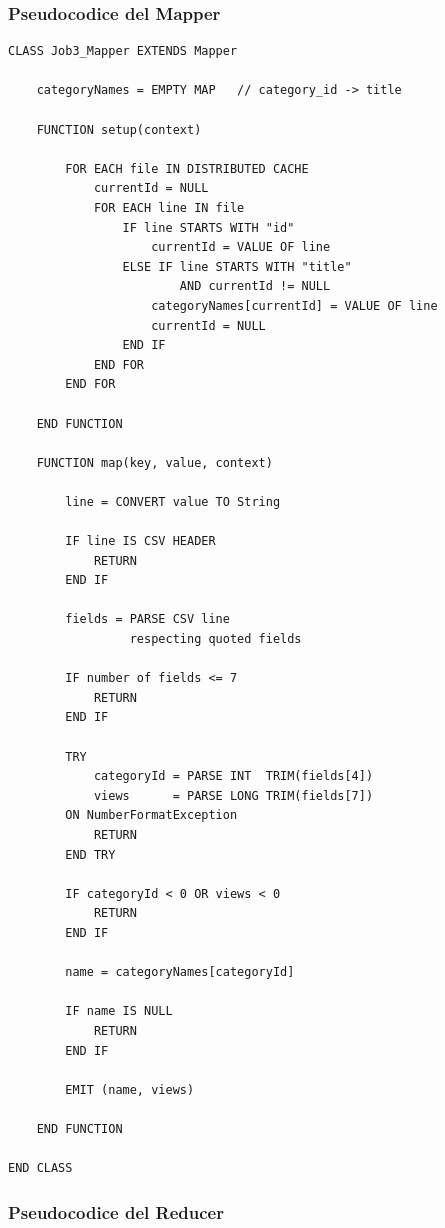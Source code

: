\documentclass[12pt, a4paper]{article}
\begin{document}
\subsubsection{Pseudocodice del Mapper}

\begin{verbatim}
CLASS Job3_Mapper EXTENDS Mapper

    categoryNames = EMPTY MAP   // category_id -> title

    FUNCTION setup(context)

        FOR EACH file IN DISTRIBUTED CACHE
            currentId = NULL
            FOR EACH line IN file
                IF line STARTS WITH "id"
                    currentId = VALUE OF line
                ELSE IF line STARTS WITH "title"
                        AND currentId != NULL
                    categoryNames[currentId] = VALUE OF line
                    currentId = NULL
                END IF
            END FOR
        END FOR

    END FUNCTION

    FUNCTION map(key, value, context)

        line = CONVERT value TO String

        IF line IS CSV HEADER
            RETURN
        END IF

        fields = PARSE CSV line
                 respecting quoted fields

        IF number of fields <= 7
            RETURN
        END IF

        TRY
            categoryId = PARSE INT  TRIM(fields[4])
            views      = PARSE LONG TRIM(fields[7])
        ON NumberFormatException
            RETURN
        END TRY

        IF categoryId < 0 OR views < 0
            RETURN
        END IF

        name = categoryNames[categoryId]

        IF name IS NULL
            RETURN
        END IF

        EMIT (name, views)

    END FUNCTION

END CLASS
\end{verbatim}

\subsubsection{Pseudocodice del Reducer}
\end{document}
